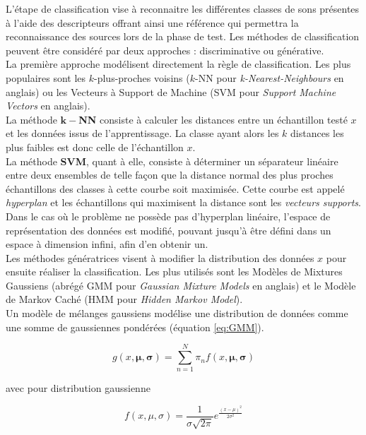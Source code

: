 L'étape de classification vise à reconnaitre les différentes classes de sons présentes à l'aide des descripteurs offrant ainsi une référence qui permettra la reconnaissance des sources lors de la phase de test. Les méthodes de classification peuvent être considéré par deux approches : discriminative ou générative.\\

La première approche modélisent directement la règle de classification. Les plus populaires sont les \og $k$-plus-proches voisins \fg{} ($k$-NN pour \textit{k-Nearest-Neighbours} en anglais) ou les Vecteurs à Support de Machine (SVM pour \textit{Support Machine Vectors} en anglais). \\

La méthode $\mathbf{k-}$\textbf{NN} consiste à calculer les distances entre un échantillon testé $x$ et les données issus de l'apprentissage. La classe ayant alors les $k$ distances les plus faibles est donc celle de l'échantillon $x$.\\

La méthode \textbf{SVM}, quant à elle, consiste à déterminer un séparateur linéaire entre deux ensembles de telle façon que la distance normal des plus proches échantillons des classes à cette courbe soit maximisée. Cette courbe est appelé \textit{hyperplan} et les échantillons qui maximisent la distance sont les \textit{vecteurs supports}. Dans le cas où le problème ne possède pas d'hyperplan linéaire, l'espace de représentation des données est modifié, pouvant jusqu'à être défini dans un espace à dimension infini, afin d'en obtenir un.\\

Les méthodes génératrices visent à modifier la distribution des données $x$ pour ensuite réaliser la classification. Les plus utilisés sont les Modèles de Mixtures Gaussiens (abrégé GMM pour \textit{Gaussian Mixture Models} en anglais) et le Modèle de Markov Caché (HMM pour \textit{Hidden Markov Model}).\\

Un modèle de mélanges gaussiens modélise une distribution de données comme une somme de gaussiennes pondérées (équation \ref{eq:GMM}). 

\begin{equation}\label{eq:GMM}
g(x,\bm{\mu},\bm{\sigma}) = \sum_{n = 1}^N \pi_n f(x,\bm{\mu}, \bm{\sigma})
\end{equation}

avec pour distribution gaussienne

\begin{equation}
f(x,\mu, \sigma) = \frac{1}{\sigma \sqrt{2\pi}}e^{\frac{(x-\mu)^2}{2\sigma^2}}
\end{equation}

